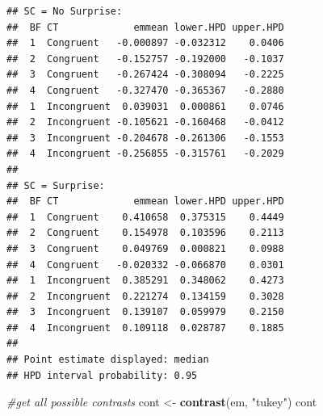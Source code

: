 \documentclass[
]{article}
\newenvironment{Shaded}{\begin{snugshade}}{\end{snugshade}}
\newcommand{\CommentTok}[1]{\textcolor[rgb]{0.56,0.35,0.01}{\textit{#1}}}
\newcommand{\FunctionTok}[1]{\textcolor[rgb]{0.13,0.29,0.53}{\textbf{#1}}}
\newcommand{\NormalTok}[1]{#1}
\newcommand{\OtherTok}[1]{\textcolor[rgb]{0.56,0.35,0.01}{#1}}
\newcommand{\StringTok}[1]{\textcolor[rgb]{0.31,0.60,0.02}{#1}}
\begin{document}
\begin{verbatim}
## SC = No Surprise:
##  BF CT             emmean lower.HPD upper.HPD
##  1  Congruent   -0.000897 -0.032312    0.0406
##  2  Congruent   -0.152757 -0.192000   -0.1037
##  3  Congruent   -0.267424 -0.308094   -0.2225
##  4  Congruent   -0.327470 -0.365367   -0.2880
##  1  Incongruent  0.039031  0.000861    0.0746
##  2  Incongruent -0.105621 -0.160468   -0.0412
##  3  Incongruent -0.204678 -0.261306   -0.1553
##  4  Incongruent -0.256855 -0.315761   -0.2029
## 
## SC = Surprise:
##  BF CT             emmean lower.HPD upper.HPD
##  1  Congruent    0.410658  0.375315    0.4449
##  2  Congruent    0.154978  0.103596    0.2113
##  3  Congruent    0.049769  0.000821    0.0988
##  4  Congruent   -0.020332 -0.066870    0.0301
##  1  Incongruent  0.385291  0.348062    0.4273
##  2  Incongruent  0.221274  0.134159    0.3028
##  3  Incongruent  0.139107  0.059979    0.2150
##  4  Incongruent  0.109118  0.028787    0.1885
## 
## Point estimate displayed: median 
## HPD interval probability: 0.95
\end{verbatim}

\begin{Shaded}
\begin{Highlighting}[]
\CommentTok{\#get all possible contrasts}
\NormalTok{cont }\OtherTok{\textless{}{-}} \FunctionTok{contrast}\NormalTok{(em, }\StringTok{"tukey"}\NormalTok{)}
\NormalTok{cont}
\end{Highlighting}
\end{Shaded}
\end{document}
